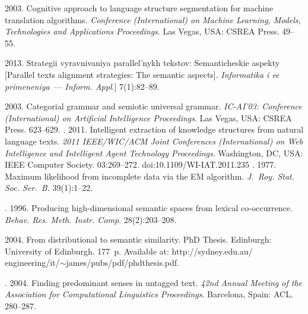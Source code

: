   \begin{multicols}{2}

\renewcommand{\bibname}{\protect\rmfamily References}

{\small\frenchspacing
{%
\begin{thebibliography}{99} 
 2003. 
Cognitive approach to language structure segmentation for machine translation algorithms. 
\textit{Conference (International) on Machine Learning, Models, Technologies and 
Applications Proceedings}. Las Vegas, USA: CSREA Press. 49--55.

 2013. Strategii vyravnivaniya parallel'nykh tekstov: 
Semanticheskie aspekty [Parallel texts alignment strategies: The semantic aspects]. 
\textit{Informatika i ee primeneniya}~--- \textit{Inform. Appl}.] 7(1):82--89.

 2003. Categorial grammar and semiotic universal grammar. 
\textit{IC-AI'03:  Conference (International) on Artificial Intelligence Proceedings}. 
Las Vegas, USA: CSREA Press. 623--629.
. 
2011. Intelligent extraction of knowledge structures from natural language texts.  
\textit{2011 IEEE/WIC/ACM  Joint Conferences (International) on Web Intelligence and 
Intelligent Agent Technology Proceedings}. 
Washington, DC, USA: IEEE Computer Society. 03:269--272. 
doi:10.1109/WI-IAT.2011.235
.
1977. Maximum likelihood from incomplete data via the EM algorithm. 
\textit{J.~Roy. Stat. Soc. Ser.~B.} 39(1):1--22.

. 1996. 
Producing high-dimensional semantic spaces from lexical co-occurrence. 
\textit{Behav. Res. Meth. Instr. Comp}. 28(2):203--208.

 2004. From distributional to semantic similarity. PhD Thesis. 
Edinburgh: University of Edinburgh. 177~p. 
Available at: {\sf http://sydney.edu.au/ engineering/it/$\sim$james/pubs/pdf/phdthesis.pdf}.

. 
2004. Finding predominant senses in untagged text. 
\textit{42nd Annual Meeting of the Association for Computational Linguistics
Proceedings}. Barcelona, Spain: ACL. 280--287.



\end{thebibliography}}}
\end{multicols}
